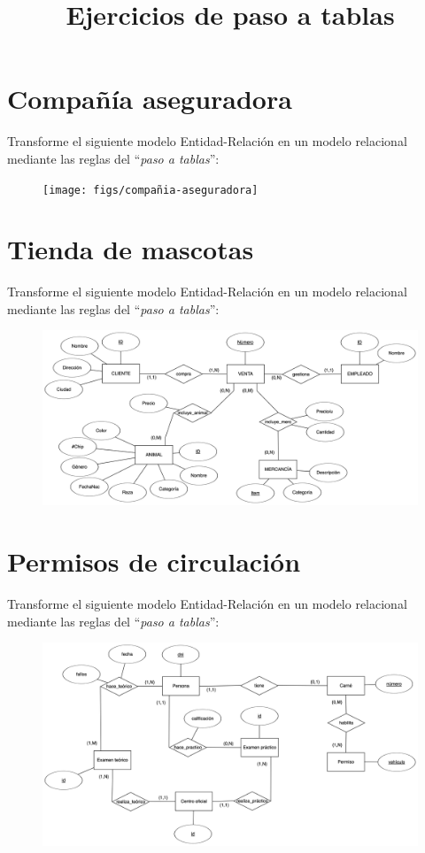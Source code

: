 \documentclass{db-practice}
\begin{document}
\title{Ejercicios de paso a tablas}

\section{Compañía aseguradora}

Transforme el siguiente modelo Entidad-Relación en un modelo relacional mediante las reglas del ``\textit{paso a tablas}'':

\begin{figure}[H]
    \centering
    \texttt{[image: figs/compañia-aseguradora]}
\end{figure}

\section{Tienda de mascotas}

Transforme el siguiente modelo Entidad-Relación en un modelo relacional mediante las reglas del ``\textit{paso a tablas}'':

\begin{figure}[H]
    \centering
    \includegraphics[width=\textwidth]{figs/tienda-de-mascotas}
\end{figure}

\newpage
\section{Permisos de circulación}

Transforme el siguiente modelo Entidad-Relación en un modelo relacional mediante las reglas del ``\textit{paso a tablas}'':

\begin{figure}[H]
    \centering
    \includegraphics[width=\textwidth]{figs/permiso-de-circulacion}
\end{figure}
\end{document}
